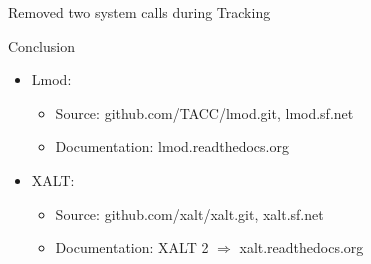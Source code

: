 \documentclass{beamer}
\begin{document}
\begin{frame}{Removed two system calls during Tracking}
\end{frame}

\begin{frame}{Conclusion}
  \begin{itemize}
    \item Lmod:
      \begin{itemize}
        \item Source: github.com/TACC/lmod.git, lmod.sf.net
        \item Documentation: lmod.readthedocs.org
      \end{itemize}
    \item XALT:
      \begin{itemize}
        \item Source: github.com/xalt/xalt.git, xalt.sf.net
        \item Documentation: XALT 2 $\Rightarrow$ xalt.readthedocs.org
      \end{itemize}
  \end{itemize}
\end{frame}

%
\end{document}
